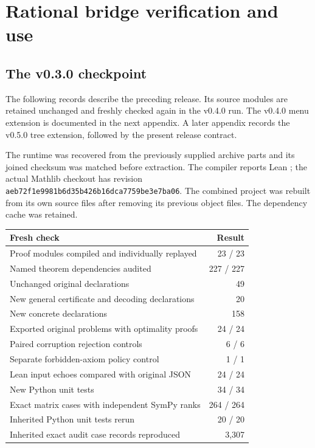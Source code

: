 \documentclass[11pt,letterpaper,oneside,openany]{book}
\theoremstyle{quiet}
\newcommand{\code}[1]{\texttt{\detokenize{#1}}}
\begin{document}
\chapter{Rational bridge verification and use}\label{app:fresh}

\section{The v0.3.0 checkpoint}

The following records describe the preceding release. Its source modules are retained unchanged and freshly checked again in the v0.4.0 run. The v0.4.0 menu extension is documented in the next appendix. A later appendix records the v0.5.0 tree extension, followed by the present release contract.

The runtime was recovered from the previously supplied archive parts and its joined checksum was matched before extraction. The compiler reports Lean \code{4.34.0-rc2}; the actual Mathlib checkout has revision \nolinkurl{aeb72f1e9981b6d35b426b16dca7759be3e7ba06}. The combined project was rebuilt from its own source files after removing its previous object files. The dependency cache was retained.

\begin{center}\begin{tabularx}{\linewidth}{@{}Xr@{}}\toprule Fresh check & Result\\\midrule

Proof modules compiled and individually replayed & 23 / 23\\

Named theorem dependencies audited & 227 / 227\\

Unchanged original declarations & 49\\

New general certificate and decoding declarations & 20\\

New concrete declarations & 158\\

Exported original problems with optimality proofs & 24 / 24\\

Paired corruption rejection controls & 6 / 6\\

Separate forbidden-axiom policy control & 1 / 1\\

Lean input echoes compared with original JSON & 24 / 24\\

New Python unit tests & 34 / 34\\

Exact matrix cases with independent SymPy ranks & 264 / 264\\

Inherited Python unit tests rerun & 20 / 20\\

Inherited exact audit case records reproduced & 3,307\\

\bottomrule\end{tabularx}\end{center}
\end{document}
